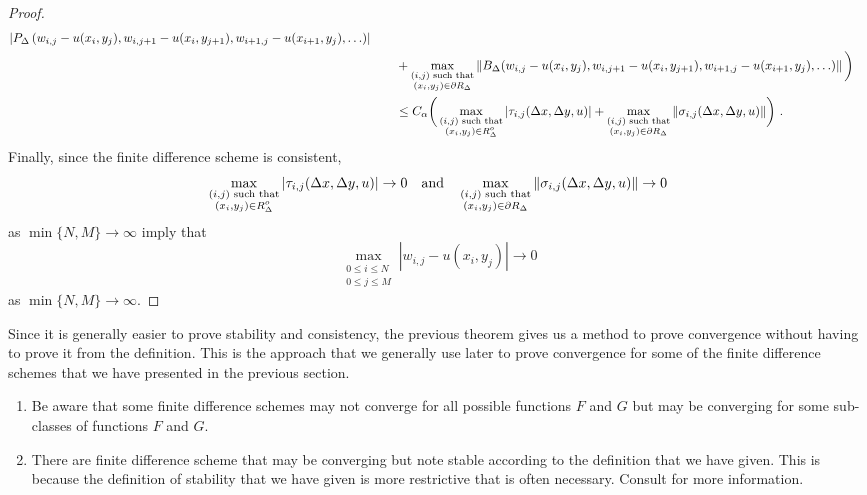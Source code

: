 \begin{proof}
\begin{align*}
\left| P_\Delta\left(w_{i,j}-u(x_i,y_j), w_{i,j+1}-u(x_i,y_{j+1}),
w_{i+1,j}- u(x_{i+1},y_j),\ldots\right) \right| \\
&\qquad
+ \max_{\substack{(i,j) \text{ such that}\\ (x_i,y_j)\in \partial R_\Delta}}
\left\| B_\Delta(w_{i,j}-u(x_i,y_j),w_{i,j+1}-u(x_i,y_{j+1}),w_{i+1,j}
  -u(x_{i+1},y_j), \ldots) \right\| \bigg) \\
& \qquad \leq C_\alpha \bigg(
\max_{\substack{(i,j) \text{ such that}\\(x_i,y_j) \in R^o_\Delta}}
|\tau_{i,j}(\Delta{x},\Delta{y},u)|
+\max_{\substack{(i,j) \text{ such that}\\(x_i,y_j) \in \partial R_\Delta}}
\|\sigma_{i,j}(\Delta{x},\Delta{y},u)\| \bigg) \ .
\end{align*}
Finally, since the finite difference scheme is consistent,
\[
\max_{\substack{(i,j) \text{ such that}\\(x_i,y_j) \in R^o_\Delta}}
|\tau_{i,j}(\Delta{x},\Delta{y},u)| \to 0 \quad \text{and} \quad
\max_{\substack{(i,j) \text{ such that}\\(x_i,y_j) \in \partial R_\Delta}}
\|\sigma_{i,j}(\Delta{x},\Delta{y},u)\| \to 0
\]
as $\min \{N, M\} \rightarrow \infty$ imply that
\[
\max_{\substack{0\leq i\leq N\\0\leq j \leq M}} |w_{i,j} - u(x_i,y_j)|
\to 0
\]
as $\min \{N, M\} \rightarrow \infty$.
\end{proof}

Since it is generally easier to prove stability and consistency, the
previous theorem gives us a method to prove convergence without having
to prove it from the definition.  This is the approach that we
generally use later to prove convergence for some of the finite
difference schemes that we have presented in the previous section.

\begin{rmkList}
\begin{enumerate}
\item Be aware that some finite difference schemes may not converge
for all possible functions $F$ and $G$ but may be converging for some
sub-classes of functions $F$ and $G$.
\item There are finite difference scheme that may be converging but
note stable according to the definition that we have given.  This is
because the definition of stability that we have given is more
restrictive that is often necessary.  Consult \cite{IK} for more
information.
\end{enumerate}
\end{rmkList}

